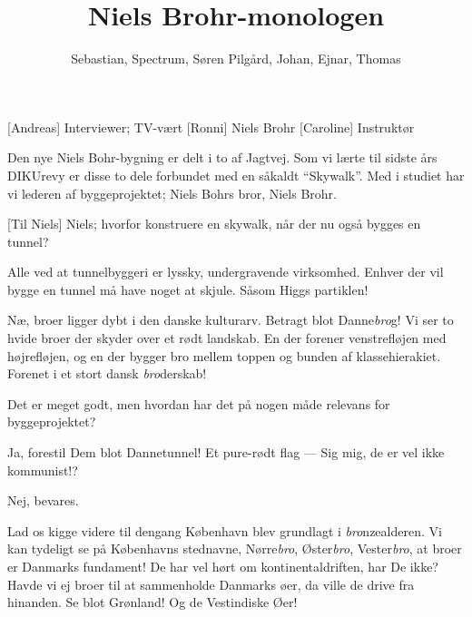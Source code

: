 \documentclass[a4paper,11pt]{article}
\title{Niels Brohr-monologen}
\author{Sebastian, Spectrum, Søren Pilgård, Johan, Ejnar, Thomas}
\begin{document}
\maketitle

\begin{roles}
  [Andreas]  Interviewer; TV-vært
  [Ronni] Niels Brohr
  [Caroline] Instruktør
\end{roles}

%

\begin{sketch}


 Den nye Niels Bohr-bygning er delt i to af Jagtvej. Som vi lærte til sidste
         års DIKUrevy er disse to dele forbundet med en såkaldt ``Skywalk''. Med i studiet har vi
         lederen af byggeprojektet; Niels Bohrs bror, Niels Brohr.

[Til Niels] Niels; hvorfor konstruere en skywalk, når der nu også bygges en tunnel?

 Alle ved at tunnelbyggeri er lyssky, undergravende virksomhed.
          Enhver der vil bygge en tunnel må have noget at skjule. Såsom Higgs partiklen!

    Næ, broer ligger dybt i den danske kulturarv.
    Betragt blot Danne\emph{bro}g! Vi ser to hvide broer der skyder over et rødt landskab.
    En der forener venstrefløjen med højrefløjen, og en der bygger bro
    mellem toppen og bunden af klassehierakiet. Forenet i et stort dansk
    \emph{bro}derskab!

 Det er meget godt, men hvordan har det på nogen måde relevans for byggeprojektet?

 Ja, forestil Dem blot Dannetunnel! Et pure-rødt flag --- Sig mig, de er vel ikke kommunist!?

 Nej, bevares.


    Lad os kigge videre til dengang København blev grundlagt i \emph{bro}nzealderen.
    Vi kan tydeligt se på Københavns stednavne, Nørre\emph{bro},
    Øster\emph{bro}, Vester\emph{bro}, at broer er Danmarks fundament!
    De har vel hørt om kontinentaldriften, har De ikke?
    Havde vi ej broer til at sammenholde Danmarks øer, da ville de drive fra
    hinanden. Se blot Grønland! Og de Vestindiske Øer!


\end{sketch}
\end{document}
